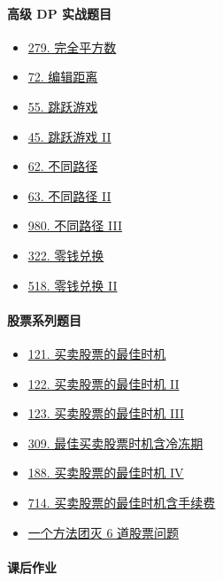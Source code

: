 \paragraph{高级 DP 实战题目}

\begin{itemize}
  \item \hyperref[leetcode:279]{279. 完全平方数}
  \item \hyperref[leetcode:72]{72. 编辑距离}
  \item \hyperref[leetcode:55]{55. 跳跃游戏}
  \item \hyperref[leetcode:45]{45. 跳跃游戏 II}
  \item \hyperref[leetcode:62]{62. 不同路径}
  \item \hyperref[leetcode:63]{63. 不同路径 II}
  \item \hyperref[leetcode:980]{980. 不同路径 III}
  \item \hyperref[leetcode:322]{322. 零钱兑换}
  \item \hyperref[leetcode:518]{518. 零钱兑换 II}
\end{itemize}

\paragraph{股票系列题目}

\begin{itemize}
  \item \hyperref[leetcode:121]{121. 买卖股票的最佳时机}
  \item \hyperref[leetcode:122]{122. 买卖股票的最佳时机 II}
  \item \hyperref[leetcode:123]{123. 买卖股票的最佳时机 III}
  \item \hyperref[leetcode:309]{309. 最佳买卖股票时机含冷冻期}
  \item \hyperref[leetcode:188]{188. 买卖股票的最佳时机 IV}
  \item \hyperref[leetcode:714]{714. 买卖股票的最佳时机含手续费}
  \item \href{https://leetcode-cn.com/problems/best-time-to-buy-and-sell-stock/solution/yi-ge-fang-fa-tuan-mie-6-dao-gu-piao-wen-ti-by-l-3/}{一个方法团灭 6 道股票问题}
\end{itemize}

\paragraph{课后作业}

